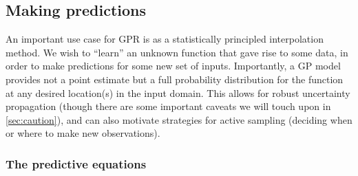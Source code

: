 \documentclass[letterpaper]{ar-1col}
\begin{document}
\subsection{Making predictions}
\label{sec:pred}

An important use case for GPR is as a statistically principled interpolation method. We wish to ``learn'' an unknown function that gave rise to some data, in order to make predictions for some new set of inputs. 
Importantly, a GP model provides not a point estimate but a full probability distribution for the function at any desired location(s) in the input domain. This allows for robust uncertainty propagation (though there are some important caveats we will touch upon in \autoref{sec:caution}), and can also motivate strategies for active sampling (deciding when or where to make new observations).

\subsubsection{The predictive equations}\label{sec:predeq}
\end{document}
